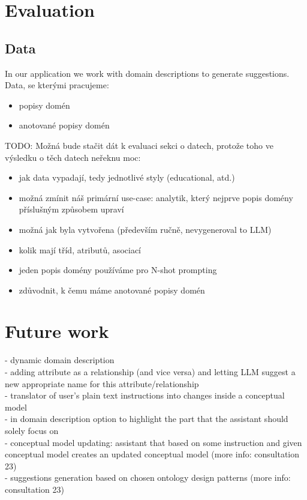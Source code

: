 \chapter{Evaluation}

\section{Data}

In our application we work with domain descriptions to generate suggestions. \\

Data, se kterými pracujeme:
\begin{itemize}
\item popisy domén
\item anotované popisy domén
\end{itemize}


TODO: Možná bude stačit dát k evaluaci sekci o datech, protože toho ve výsledku o těch datech neřeknu moc:
\begin{itemize}
\item jak data vypadají, tedy jednotlivé styly (educational, atd.)
\item možná zmínit náš primární use-case: analytik, který nejprve popis domény příslušným způsobem upraví
\item možná jak byla vytvořena (především ručně, nevygeneroval to LLM)
\item kolik mají tříd, atributů, asociací
\item jeden popis domény používáme pro N-shot prompting
\item zdůvodnit, k čemu máme anotované popisy domén
\end{itemize}



\chapter{Future work}

- dynamic domain description \\

- adding attribute as a relationship (and vice versa) and letting LLM suggest a new appropriate name for this attribute/relationship \\

- translator of user's plain text instructions into changes inside a conceptual model \\

- in domain description option to highlight the part that the assistant should solely focus on \\

- conceptual model updating: assistant that based on some instruction and given conceptual model creates an updated conceptual model (more info: consultation 23) \\

- suggestions generation based on chosen ontology design patterns (more info: consultation 23) \\

